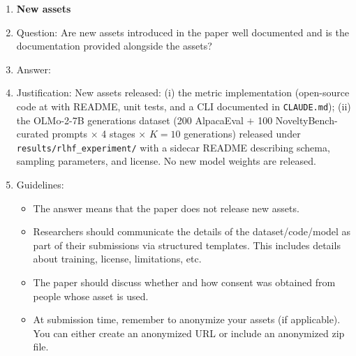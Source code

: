 \begin{enumerate}
\item {\bf New assets}
    \item[] Question: Are new assets introduced in the paper well documented and is the documentation provided alongside the assets?
    \item[] Answer: \answerYes{}
    \item[] Justification: New assets released: (i) the metric implementation (open-source code at \projectGithubUrl{} with README, unit tests, and a CLI documented in \texttt{CLAUDE.md}); (ii) the OLMo-2-7B generations dataset (200 AlpacaEval $+$ 100 NoveltyBench-curated prompts $\times$ 4 stages $\times$ $K=10$ generations) released under \texttt{results/rlhf\_experiment/} with a sidecar README describing schema, sampling parameters, and license. No new model weights are released.
    \item[] Guidelines:
    \begin{itemize}
        \item The answer \answerNA{} means that the paper does not release new assets.
        \item Researchers should communicate the details of the dataset\slash code\slash model as part of their submissions via structured templates. This includes details about training, license, limitations, etc.
        \item The paper should discuss whether and how consent was obtained from people whose asset is used.
        \item At submission time, remember to anonymize your assets (if applicable). You can either create an anonymized URL or include an anonymized zip file.
    \end{itemize}


\end{enumerate}
